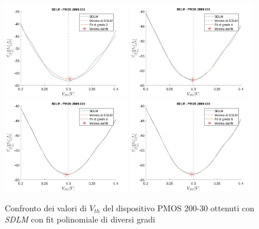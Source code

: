 \documentclass[12pt, letterpaper]{book}
\begin{document}
\begin{figure}[h!]
  \centering
  \includegraphics[width=0.49\textwidth]{SDLM-P1-200-30-grado2}
  \includegraphics[width=0.49\textwidth]{SDLM-P1-200-30-grado4}
  \includegraphics[width=0.49\textwidth]{SDLM-P1-200-30-grado6}
  \includegraphics[width=0.49\textwidth]{SDLM-P1-200-30-grado8}
  \caption{Confronto dei valori di $V_{th}$ del dispositivo PMOS 200-30 ottenuti con \emph{SDLM} con fit polinomiale di diversi gradi}
  \label{fig:GradiSDLM}
\end{figure}
\end{document}
